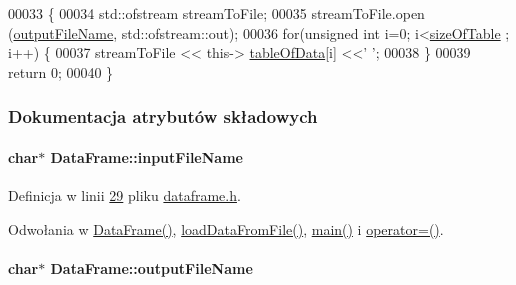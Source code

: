 \begin{DoxyCode}
00033 \{
00034         std::ofstream streamToFile;
00035         streamToFile.open (\hyperlink{class_data_frame_a824a73f019aec71281837abafd95a510}{outputFileName}, std::ofstream::out);
00036         \textcolor{keywordflow}{for}(\textcolor{keywordtype}{unsigned} \textcolor{keywordtype}{int} i=0; i<\hyperlink{class_data_frame_aa5d1905c6910cad07ab5189bd34b13ab}{sizeOfTable} ; i++) \{
00037                 streamToFile << this-> \hyperlink{class_data_frame_a8edc4ce524483e2e5069067267ccdcbf}{tableOfData}[i] <<\textcolor{charliteral}{' '};
00038         \}
00039         \textcolor{keywordflow}{return} 0;
00040 \}
\end{DoxyCode}


\subsubsection{Dokumentacja atrybutów składowych}
\hypertarget{class_data_frame_a90041bfdf474b0d7ce39bc3dbbb55aa9}{
\paragraph[{input\-File\-Name}]{\setlength{\rightskip}{0pt plus 5cm}char$\ast$ Data\-Frame\-::input\-File\-Name}}\label{class_data_frame_a90041bfdf474b0d7ce39bc3dbbb55aa9}


Definicja w linii \hyperlink{dataframe_8h_source_l00029}{29} pliku \hyperlink{dataframe_8h_source}{dataframe.\-h}.



Odwołania w \hyperlink{dataframe_8cpp_source_l00012}{Data\-Frame()}, \hyperlink{dataframe_8cpp_source_l00020}{load\-Data\-From\-File()}, \hyperlink{main_8cpp_source_l00018}{main()} i \hyperlink{dataframe_8cpp_source_l00044}{operator=()}.

\hypertarget{class_data_frame_a824a73f019aec71281837abafd95a510}{
\paragraph[{output\-File\-Name}]{\setlength{\rightskip}{0pt plus 5cm}char$\ast$ Data\-Frame\-::output\-File\-Name}}\label{class_data_frame_a824a73f019aec71281837abafd95a510}


